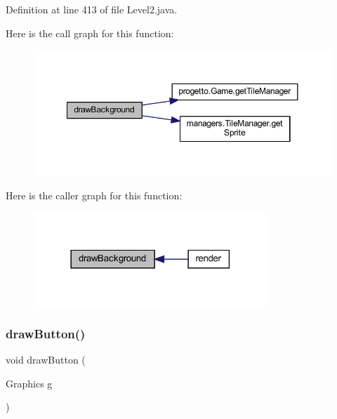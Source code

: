 Definition at line 413 of file Level2.\+java.

Here is the call graph for this function\+:
\nopagebreak
\begin{figure}[H]
\begin{center}
\leavevmode
\includegraphics[width=350pt]{classscenes_1_1_level2_a62bcb07be9e39896e5837a9d396e7235_cgraph}
\end{center}
\end{figure}
Here is the caller graph for this function\+:\nopagebreak
\begin{figure}[H]
\begin{center}
\leavevmode
\includegraphics[width=249pt]{classscenes_1_1_level2_a62bcb07be9e39896e5837a9d396e7235_icgraph}
\end{center}
\end{figure}
\mbox{\label{classscenes_1_1_level2_a65768678909bc0512c6cb9780709ad38}} 
\subsubsection{\texorpdfstring{draw\+Button()}{drawButton()}}
{\footnotesize\ttfamily void draw\+Button (\begin{DoxyParamCaption}\item[{Graphics}]{g }\end{DoxyParamCaption})\hspace{0.3cm}{\ttfamily [private]}}



